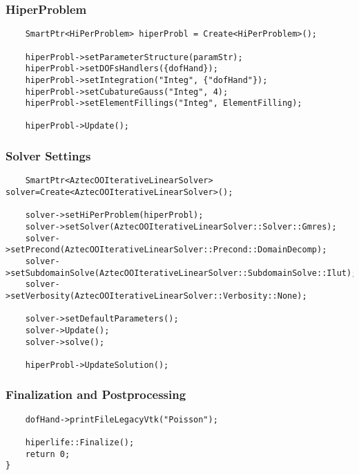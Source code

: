 \documentclass[]{article}
\begin{document}
\subsubsection{HiperProblem} \label{sec: hpc}
\begin{lstlisting}
	SmartPtr<HiPerProblem> hiperProbl = Create<HiPerProblem>();
	
	hiperProbl->setParameterStructure(paramStr);
	hiperProbl->setDOFsHandlers({dofHand});
	hiperProbl->setIntegration("Integ", {"dofHand"});
	hiperProbl->setCubatureGauss("Integ", 4);
	hiperProbl->setElementFillings("Integ", ElementFilling);
	
	hiperProbl->Update();
\end{lstlisting}

\subsubsection{Solver Settings} \label{sec: slv}
\begin{lstlisting}
	SmartPtr<AztecOOIterativeLinearSolver> solver=Create<AztecOOIterativeLinearSolver>();
	
	solver->setHiPerProblem(hiperProbl);
	solver->setSolver(AztecOOIterativeLinearSolver::Solver::Gmres);
	solver->setPrecond(AztecOOIterativeLinearSolver::Precond::DomainDecomp);
	solver->setSubdomainSolve(AztecOOIterativeLinearSolver::SubdomainSolve::Ilut);
	solver->setVerbosity(AztecOOIterativeLinearSolver::Verbosity::None);
	
	solver->setDefaultParameters();
	solver->Update();
	solver->solve();
	
	hiperProbl->UpdateSolution();
\end{lstlisting}

\subsubsection{Finalization and Postprocessing} \label{sec: fnl}
\begin{lstlisting}
	dofHand->printFileLegacyVtk("Poisson");
		
	hiperlife::Finalize();
	return 0;
}
\end{lstlisting}
\end{document}
